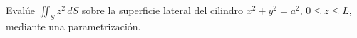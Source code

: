Evalúe $\iint_S z^2\,dS$ sobre la superficie lateral del cilindro $x^2+y^2=a^2$, $0\leq z\leq L$, mediante una parametrización.
